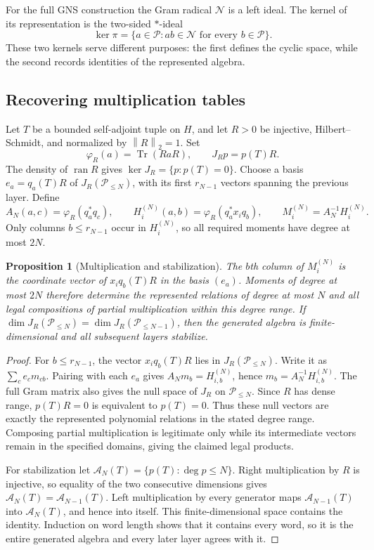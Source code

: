\documentclass[11pt,a4paper]{amsart}
\numberwithin{equation}{section}
\newtheorem{proposition}[theorem]{Proposition}
\theoremstyle{definition}
\theoremstyle{remark}
\newcommand{\PP}{\mathcal P}
\DeclareMathOperator{\Tr}{Tr}
\DeclareMathOperator{\ran}{ran}
\newcommand{\norm}[1]{\left\lVert#1\right\rVert}
\begin{document}
For the full GNS construction the Gram radical $\mathcal N$ is a left ideal. The kernel of its representation is the two-sided $*$-ideal
\begin{equation}\label{eq:representationkernel}
 \ker\pi=\{a\in\PP:ab\in\mathcal N\text{ for every }b\in\PP\}.
\end{equation}
These two kernels serve different purposes: the first defines the cyclic space, while the second records identities of the represented algebra.

\subsection{Recovering multiplication tables}
Let $T$ be a bounded self-adjoint tuple on $H$, and let $R>0$ be injective, Hilbert--Schmidt, and normalized by $\norm R_2=1$. Set
\[
 \varphi_R(a)=\Tr(RaR),\qquad J_Rp=p(T)R.
\]
The density of $\ran R$ gives $\ker J_R=\{p:p(T)=0\}$. Choose a basis $e_a=q_a(T)R$ of $J_R(\PP_{\le N})$, with its first $r_{N-1}$ vectors spanning the previous layer. Define
\begin{equation}\label{eq:multiplicationmatrices}
 A_N(a,c)=\varphi_R(q_a^*q_c),\qquad
 H_i^{(N)}(a,b)=\varphi_R(q_a^*x_iq_b),\qquad
 M_i^{(N)}=A_N^{-1}H_i^{(N)}.
\end{equation}
Only columns $b\le r_{N-1}$ occur in $H_i^{(N)}$, so all required moments have degree at most $2N$.

\begin{proposition}[Multiplication and stabilization]\label{prop:multiplicationtable}
The $b$th column of $M_i^{(N)}$ is the coordinate vector of $x_iq_b(T)R$ in the basis $(e_a)$. Moments of degree at most $2N$ therefore determine the represented relations of degree at most $N$ and all legal compositions of partial multiplication within this degree range. If
$\dim J_R(\PP_{\le N})=\dim J_R(\PP_{\le N-1})$,
then the generated algebra is finite-dimensional and all subsequent layers stabilize.
\end{proposition}
\begin{proof}
For $b\le r_{N-1}$, the vector $x_iq_b(T)R$ lies in $J_R(\PP_{\le N})$. Write it as $\sum_ce_cm_{cb}$. Pairing with each $e_a$ gives $A_Nm_b=H_{i,b}^{(N)}$, hence $m_b=A_N^{-1}H_{i,b}^{(N)}$. The full Gram matrix also gives the null space of $J_R$ on $\PP_{\le N}$. Since $R$ has dense range, $p(T)R=0$ is equivalent to $p(T)=0$. Thus these null vectors are exactly the represented polynomial relations in the stated degree range. Composing partial multiplication is legitimate only while its intermediate vectors remain in the specified domains, giving the claimed legal products.

For stabilization let $\mathcal A_N(T)=\{p(T):\deg p\le N\}$. Right multiplication by $R$ is injective, so equality of the two consecutive dimensions gives $\mathcal A_N(T)=\mathcal A_{N-1}(T)$. Left multiplication by every generator maps $\mathcal A_{N-1}(T)$ into $\mathcal A_N(T)$, and hence into itself. This finite-dimensional space contains the identity. Induction on word length shows that it contains every word, so it is the entire generated algebra and every later layer agrees with it.
\end{proof}
\end{document}
